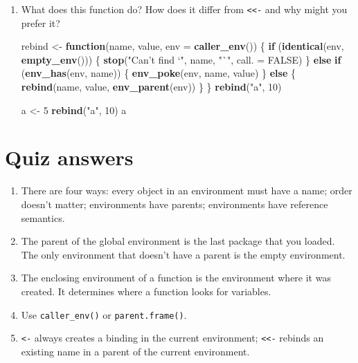 \documentclass[]{book}
\newenvironment{Shaded}{\begin{snugshade}}{\end{snugshade}}
\newcommand{\KeywordTok}[1]{\textcolor[rgb]{0.13,0.29,0.53}{\textbf{#1}}}
\newcommand{\DataTypeTok}[1]{\textcolor[rgb]{0.13,0.29,0.53}{#1}}
\newcommand{\DecValTok}[1]{\textcolor[rgb]{0.00,0.00,0.81}{#1}}
\newcommand{\StringTok}[1]{\textcolor[rgb]{0.31,0.60,0.02}{#1}}
\newcommand{\OtherTok}[1]{\textcolor[rgb]{0.56,0.35,0.01}{#1}}
\newcommand{\ControlFlowTok}[1]{\textcolor[rgb]{0.13,0.29,0.53}{\textbf{#1}}}
\newcommand{\NormalTok}[1]{#1}
\theoremstyle{definition}
\theoremstyle{definition}
\theoremstyle{definition}
\theoremstyle{remark}
\begin{document}
\begin{enumerate}
\def\labelenumi{\arabic{enumi}.}
\item
  What does this function do? How does it differ from
  \texttt{\textless{}\textless{}-} and why might you prefer it?

\begin{Shaded}
\begin{Highlighting}[]
\NormalTok{rebind <-}\StringTok{ }\ControlFlowTok{function}\NormalTok{(name, value, }\DataTypeTok{env =} \KeywordTok{caller_env}\NormalTok{()) \{}
  \ControlFlowTok{if}\NormalTok{ (}\KeywordTok{identical}\NormalTok{(env, }\KeywordTok{empty_env}\NormalTok{())) \{}
    \KeywordTok{stop}\NormalTok{(}\StringTok{"Can't find `"}\NormalTok{, name, }\StringTok{"`"}\NormalTok{, }\DataTypeTok{call. =} \OtherTok{FALSE}\NormalTok{)}
\NormalTok{  \} }\ControlFlowTok{else} \ControlFlowTok{if}\NormalTok{ (}\KeywordTok{env_has}\NormalTok{(env, name)) \{}
    \KeywordTok{env_poke}\NormalTok{(env, name, value)}
\NormalTok{  \} }\ControlFlowTok{else}\NormalTok{ \{}
    \KeywordTok{rebind}\NormalTok{(name, value, }\KeywordTok{env_parent}\NormalTok{(env))}
\NormalTok{  \}}
\NormalTok{\}}
\KeywordTok{rebind}\NormalTok{(}\StringTok{"a"}\NormalTok{, }\DecValTok{10}\NormalTok{)}
\end{Highlighting}
\end{Shaded}

\begin{Shaded}
\begin{Highlighting}[]
\NormalTok{a <-}\StringTok{ }\DecValTok{5}
\KeywordTok{rebind}\NormalTok{(}\StringTok{"a"}\NormalTok{, }\DecValTok{10}\NormalTok{)}
\NormalTok{a}
\end{Highlighting}
\end{Shaded}
\end{enumerate}

\hypertarget{env-answers}{\section{Quiz answers}\label{env-answers}}

\begin{enumerate}
\def\labelenumi{\arabic{enumi}.}
\item
  There are four ways: every object in an environment must have a name;
  order doesn't matter; environments have parents; environments have
  reference semantics.
\item
  The parent of the global environment is the last package that you
  loaded. The only environment that doesn't have a parent is the empty
  environment.
\item
  The enclosing environment of a function is the environment where it
  was created. It determines where a function looks for variables.
\item
  Use \texttt{caller\_env()} or \texttt{parent.frame()}.
\item
  \texttt{\textless{}-} always creates a binding in the current
  environment; \texttt{\textless{}\textless{}-} rebinds an existing name
  in a parent of the current environment.
\end{enumerate}
\end{document}

